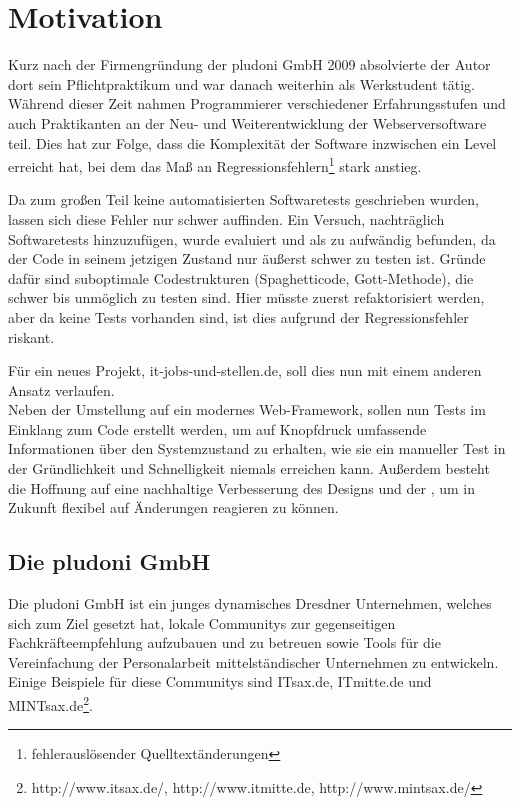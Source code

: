 \section{Motivation}

Kurz nach der Firmengründung der pludoni GmbH 2009 absolvierte der Autor dort sein Pflichtpraktikum und war danach weiterhin als Werkstudent tätig.
Während dieser Zeit nahmen Programmierer verschiedener Erfahrungsstufen und auch Praktikanten an der Neu- und Weiterentwicklung der Webserversoftware teil. Dies hat zur Folge, dass die Komplexität der Software inzwischen ein Level erreicht hat, bei dem das Maß an Regressionsfehlern\footnote{fehlerauslösender Quelltextänderungen} stark anstieg.

Da zum großen Teil keine automatisierten Softwaretests geschrieben wurden, lassen sich diese Fehler nur schwer auffinden. Ein Versuch, nachträglich Softwaretests hinzuzufügen, wurde evaluiert und als zu aufwändig befunden, da der Code in seinem jetzigen Zustand nur äußerst schwer zu testen ist. Gründe dafür sind suboptimale Codestrukturen (Spaghetticode, Gott-Methode), die schwer bis unmöglich zu testen sind. Hier müsste zuerst refaktorisiert werden, aber da keine Tests vorhanden sind, ist dies aufgrund der Regressionsfehler riskant. %

Für ein neues Projekt, it-jobs-und-stellen.de, soll dies nun mit einem anderen Ansatz verlaufen.\\
Neben der Umstellung auf ein modernes Web-Framework, sollen nun Tests im Einklang zum Code erstellt werden, um auf Knopfdruck umfassende Informationen über den Systemzustand zu erhalten, wie sie ein manueller Test in der Gründlichkeit und Schnelligkeit niemals erreichen kann. Außerdem besteht die Hoffnung auf eine nachhaltige Verbesserung des Designs und der , um in Zukunft flexibel auf Änderungen reagieren zu können.


\subsection{Die pludoni GmbH}

Die pludoni GmbH ist ein junges dynamisches Dresdner Unternehmen, welches sich zum Ziel gesetzt hat, lokale Communitys zur gegenseitigen Fachkräfteempfehlung aufzubauen und zu betreuen sowie Tools für die Vereinfachung der Personalarbeit mittelständischer Unternehmen zu entwickeln. Einige Beispiele für diese Communitys sind ITsax.de, ITmitte.de und MINTsax.de\footnote{http://www.itsax.de/, http://www.itmitte.de, http://www.mintsax.de/}.

